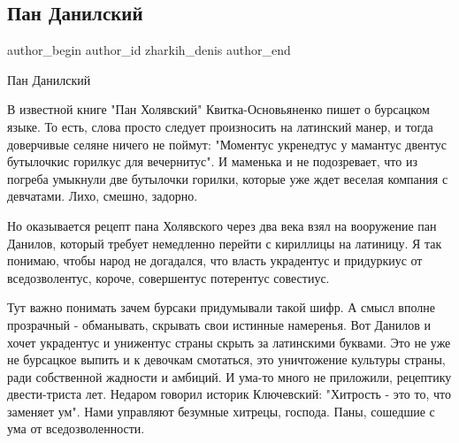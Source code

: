  
 
 
 
 
 
\subsection{Пан Данилский}
\label{sec:12_09_2021.fb.zharkih_denis.1.pan_danilskij}
 
\ifcmt
 author_begin
   author_id zharkih_denis
 author_end
\fi

Пан Данилский

В известной книге "Пан Холявский" Квитка-Основьяненко пишет о бурсацком языке.
То есть, слова просто следует произносить на латинский манер, и тогда
доверчивые селяне ничего не поймут: "Моментус укренедтус у мамантус двентус
бутылочкис горилкус для вечернитус". И маменька и не подозревает, что из
погреба умыкнули две бутылочки горилки, которые уже ждет веселая компания с
девчатами. Лихо, смешно, задорно. 

Но оказывается рецепт пана Холявского через два века взял на вооружение пан
Данилов, который требует немедленно перейти с кириллицы на латиницу.  Я так
понимаю, чтобы народ не догадался, что власть украдентус и придуркиус от
вседозволентус, короче, совершентус потерентус совестиус. 

Тут важно понимать зачем бурсаки придумывали такой шифр. А смысл вполне
прозрачный - обманывать, скрывать свои истинные намеренья. Вот Данилов и хочет
украдентус и унижентус страны скрыть за латинскими буквами. Это не уже не
бурсацкое выпить и к девочкам смотаться, это уничтожение культуры страны, ради
собственной жадности и амбиций. И ума-то много не приложили, рецептику
двести-триста лет. Недаром говорил историк Ключевский: "Хитрость - это то, что
заменяет ум". Нами управляют безумные хитрецы, господа. Паны, сошедшие с ума от
вседозволенности.

